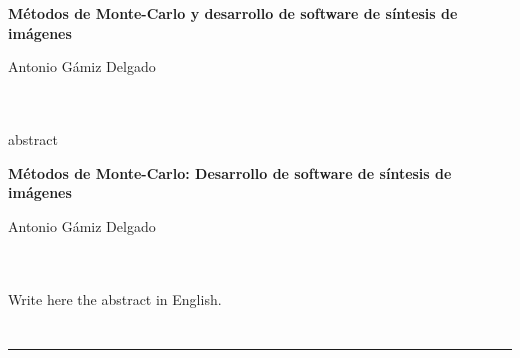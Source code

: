 \chapter*{}


\cleardoublepage
\thispagestyle{empty}

\begin{center}
{\large\bfseries Métodos de Monte-Carlo y desarrollo de software de síntesis de imágenes}\\
\end{center}
\begin{center}
Antonio Gámiz Delgado\\
\end{center}

\\

\vspace{0.7cm}
\\

abstract


\cleardoublepage


\thispagestyle{empty}


\begin{center}
{\large\bfseries Métodos de Monte-Carlo: Desarrollo de software de síntesis de imágenes}\\
\end{center}
\begin{center}
Antonio Gámiz Delgado\\
\end{center}

\\

\vspace{0.7cm}
\\

Write here the abstract in English.

\chapter*{}
\thispagestyle{empty}

\noindent\rule[-1ex]{\textwidth}{2pt}\\[4.5ex]

